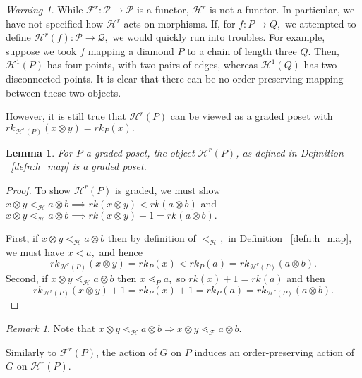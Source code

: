 \documentclass{amsart}
\newtheorem{lem}[thm]{Lemma}
\theoremstyle{remark}
\newtheorem{rem}[thm]{Remark}
\newtheorem{warning}[thm]{Warning}
\begin{document}
\begin{warning}
While $\mathcal F^r:\mathcal P \rightarrow \mathcal P$ is a functor, $\mathcal H^r$ is not a functor. In particular, we have not specified how $\mathcal H^r$ acts on morphisms. If, for $f:P \rightarrow Q,$ we attempted to define $\mathcal H^r(f):\mathcal P \rightarrow \mathcal Q,$ we would quickly run into troubles. For example, suppose we took $f$ mapping a diamond $P$ to a chain of length three $Q$. Then, $\mathcal H^1(P)$ has four points, with two pairs of edges, whereas $\mathcal H^1(Q)$ has two disconnected points. It is clear that there can be no order preserving mapping between these two objects. 

However, it is still true that $\mathcal H^r(P)$ can be viewed as a graded poset with $rk_{\mathcal H^r(P)}(x\otimes y) = rk_P(x).$
\end{warning}

\begin{lem}\label{lem:HP_order}
For $P$ a graded poset, the object $\mathcal{H}^r(P)$, as defined in Definition ~\ref{defn:h_map} is a graded poset.
\end{lem}
\begin{proof}
To show $\mathcal H^r(P)$ is graded, we must show $x\otimes y <_{\mathcal H} a \otimes b \implies rk(x\otimes y)<rk(a \otimes b)$ and $x\otimes y \lessdot_{\mathcal H} a \otimes b \implies rk(x\otimes y)+1 = rk(a \otimes b).$ 

First, if $x\otimes y <_{\mathcal H} a \otimes b$ then by definition of $<_{\mathcal H},$ in Definition ~\ref{defn:h_map}, we must have $x < a,$ and hence 
$$rk_{\mathcal H^r(P)}(x\otimes y) = rk_P(x)<rk_P(a) = rk_{\mathcal H^r(P)}(a\otimes b).$$
Second, if $x\otimes y \lessdot_{\mathcal H} a \otimes b$ then $x \lessdot_P a,$ so $rk(x)+1 = rk(a)$ and then $$rk_{\mathcal H^r(P)}(x\otimes y)+1 = rk_P(x) +1=rk_P(a)= rk_{\mathcal H^r(P)}(a\otimes b).$$
\end{proof}

\begin{rem}\label{rem:order_containment}
Note that $x\otimes y\lessdot_{\mathcal{H}} a\otimes b \Rightarrow x\otimes y\lessdot_{\mathcal{F}} a\otimes b$.
\end{rem}

Similarly to $\mathcal{F}^r(P)$, the action of $G$ on $P$ induces an order-preserving action of $G$ on $\mathcal{H}^r(P)$.
\end{document}
